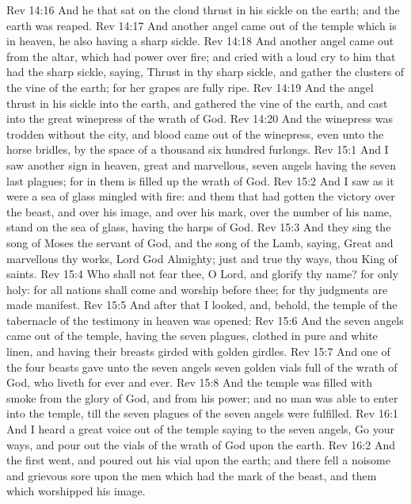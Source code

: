 \vs Rev 14:16 And he that sat on the cloud thrust in his sickle on the earth; and the earth was reaped.
\vs Rev 14:17 And another angel came out of the temple which is in heaven, he also having a sharp sickle.
\vs Rev 14:18 And another angel came out from the altar, which had power over fire; and cried with a loud cry to him that had the sharp sickle, saying, Thrust in thy sharp sickle, and gather the clusters of the vine of the earth; for her grapes are fully ripe.
\vs Rev 14:19 And the angel thrust in his sickle into the earth, and gathered the vine of the earth, and cast  into the great winepress of the wrath of God.
\vs Rev 14:20 And the winepress was trodden without the city, and blood came out of the winepress, even unto the horse bridles, by the space of a thousand  six hundred furlongs.
\vs Rev 15:1 And I saw another sign in heaven, great and marvellous, seven angels having the seven last plagues; for in them is filled up the wrath of God.
\vs Rev 15:2 And I saw as it were a sea of glass mingled with fire: and them that had gotten the victory over the beast, and over his image, and over his mark,  over the number of his name, stand on the sea of glass, having the harps of God.
\vs Rev 15:3 And they sing the song of Moses the servant of God, and the song of the Lamb, saying, Great and marvellous  thy works, Lord God Almighty; just and true  thy ways, thou King of saints.
\vs Rev 15:4 Who shall not fear thee, O Lord, and glorify thy name? for  only  holy: for all nations shall come and worship before thee; for thy judgments are made manifest.
\vs Rev 15:5 And after that I looked, and, behold, the temple of the tabernacle of the testimony in heaven was opened:
\vs Rev 15:6 And the seven angels came out of the temple, having the seven plagues, clothed in pure and white linen, and having their breasts girded with golden girdles.
\vs Rev 15:7 And one of the four beasts gave unto the seven angels seven golden vials full of the wrath of God, who liveth for ever and ever.
\vs Rev 15:8 And the temple was filled with smoke from the glory of God, and from his power; and no man was able to enter into the temple, till the seven plagues of the seven angels were fulfilled.
\vs Rev 16:1 And I heard a great voice out of the temple saying to the seven angels, Go your ways, and pour out the vials of the wrath of God upon the earth.
\vs Rev 16:2 And the first went, and poured out his vial upon the earth; and there fell a noisome and grievous sore upon the men which had the mark of the beast, and  them which worshipped his image.
